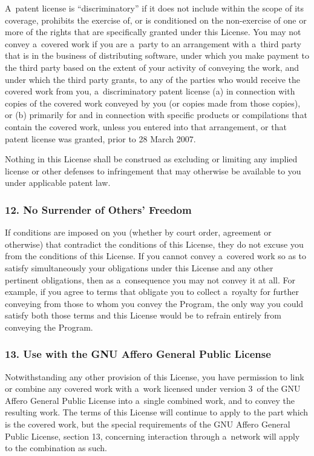 \documentclass[a4paper, 11pt, twoside]{article}
\begin{document}
A~patent license is “discriminatory” if it does not include within the scope of its coverage, prohibits the exercise of, or is conditioned on the non-exercise of one or more of the rights that are specifically granted under this License. You may not convey a~covered work if you are a~party to an arrangement with a~third party that is in the business of distributing software, under which you make payment to the third party based on the extent of your activity of conveying the work, and under which the third party grants, to any of the parties who would receive the covered work from you, a~discriminatory patent license (a) in connection with copies of the covered work conveyed by you (or copies made from those copies), or (b) primarily for and in connection with specific products or compilations that contain the covered work, unless you entered into that arrangement, or that patent license was granted, prior to 28 March 2007.

Nothing in this License shall be construed as excluding or limiting any implied license or other defenses to infringement that may otherwise be available to you under applicable patent law.

\subsubsection{12. No Surrender of Others' Freedom}

If conditions are imposed on you (whether by court order, agreement or otherwise) that contradict the conditions of this License, they do not excuse you from the conditions of this License. If you cannot convey a~covered work so as to satisfy simultaneously your obligations under this License and any other pertinent obligations, then as a~consequence you may not convey it at all. For example, if you agree to terms that obligate you to collect a~royalty for further conveying from those to whom you convey the Program, the only way you could satisfy both those terms and this License would be to refrain entirely from conveying the Program.

\subsubsection{13. Use with the GNU Affero General Public License}

Notwithstanding any other provision of this License, you have permission to link or combine any covered work with a~work licensed under version 3~of the GNU Affero General Public License into a~single combined work, and to convey the resulting work. The terms of this License will continue to apply to the part which is the covered work, but the special requirements of the GNU Affero General Public License, section 13, concerning interaction through a~network will apply to the combination as such.
\end{document}
